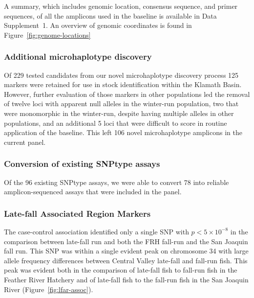 A summary, which includes genomic location, consensus sequence, and primer sequences,
of all the amplicons used in the baseline is available
in Data Supplement~1.  An overview of genomic coordinates is found in Figure~\ref{fig:genome-locations}

\subsubsection*{Additional microhaplotype discovery}

Of 229 tested candidates from our novel microhaplotype discovery process
125 markers were retained \citep{thompson2020complex}
for use in stock identification within
the Klamath Basin.  However, further evaluation of those markers in other
populations led the removal of
twelve loci with apparent null alleles in the winter-run population, two that were monomorphic
in the winter-run, despite having
multiple alleles in other populations, and an additional 5 loci that were
difficult to score in routine application of the baseline. This left 106
novel microhaplotype amplicons in the current panel.


\subsubsection*{Conversion of existing SNPtype assays}

Of the 96 existing SNPtype assays, we were able to convert 78
into reliable amplicon-sequenced assays that were included in the panel.



\subsubsection*{Late-fall Associated Region Markers}

The case-control association identified only a single SNP with $p < 5\times 10^{-8}$ in the comparison
between late-fall run and both the FRH fall-run and the San Joaquin fall run.  This SNP was within
a single evident peak on chromosome 34 with large allele frequency differences
between Central Valley late-fall and fall-run fish.  This peak was evident both in the comparison of
late-fall fish to fall-run fish in the Feather River Hatchery and of late-fall fish to the fall-run fish in
the San Joaquin River (Figure~\ref{fig:lfar-assoc}).




